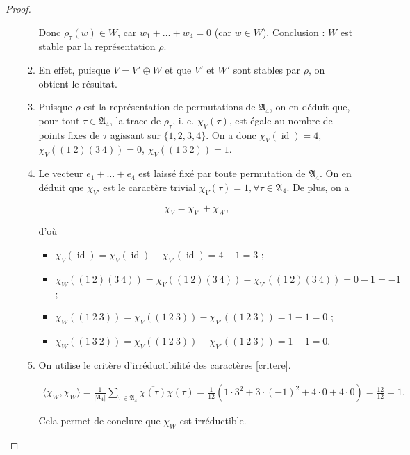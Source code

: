 \documentclass[french]{book}
\theoremstyle{definition}
\begin{document}
\begin{proof}
\begin{enumerate}
\begin{enumerate}
      Donc \(\rho _{\tau}(w) \in W\), car \(w_1 + \dots + w_4 = 0\) (car \(w \in W\)). Conclusion : \(W\) est stable par la représentation \(\rho\).
      \item En effet, puisque \(V = V' \oplus W\) et que \(V'\) et \(W'\) sont stables par \(\rho\), on obtient le résultat.
      \item Puisque \(\rho\) est la représentation de permutations de \(\mathfrak{A}_{4}\), on en déduit que, pour tout \(\tau \in \mathfrak{A}_{4}\), la trace de \(\rho _{\tau}\), i. e. \(\chi_V(\tau)\), est égale au nombre de points fixes de \(\tau\) agissant sur \(\{ 1, 2, 3, 4 \}\). On a donc \(\chi_V(\operatorname{id}) = 4\), \(\chi_V((1 \ 2)(3 \ 4)) = 0\), \(\chi_V((1 \ 3 \ 2)) = 1\).
      \item Le vecteur \(e_1 + \dots + e_4\) est laissé fixé par toute permutation de \(\mathfrak{A}_{4}\). On en déduit que \(\chi _{V'}\) est le caractère trivial \(\chi_V(\tau) = 1, \forall \tau \in \mathfrak{A}_{4}\). De plus, on a

      \[\chi_V = \chi _{V'} + \chi_W,\]

      d'où

      \begin{itemize}
        \item \(\chi_V(\operatorname{id}) = \chi_V(\operatorname{id}) - \chi _{V'}(\operatorname{id}) = 4-1 = 3\) ;
        \item \(\chi_W((1 \ 2) (3 \ 4)) = \chi_V((1 \ 2) (3 \ 4)) - \chi _{V'}((1 \ 2) (3 \ 4)) = 0 -1 = -1\) ;
        \item \(\chi_W ((1 \ 2 \ 3)) = \chi _{V}((1 \ 2 \ 3)) - \chi _{V'}((1 \ 2 \ 3)) = 1 - 1 = 0\) ;
        \item \(\chi_W ((1 \ 3 \ 2)) = \chi_V((1 \ 2 \ 3)) - \chi _{V'}((1 \ 2 \ 3)) = 1 - 1 = 0\).
      \end{itemize}

      \item On utilise le critère d'irréductibilité des caractères \ref{critere}.

      \begin{gather*}
        \langle \chi_W, \chi_W \rangle = \frac{1}{\left\lvert \mathfrak{A}_{4} \right\rvert} \sum_{\tau \in \mathfrak{A}_{4}} \overline{\chi(\tau)} \chi(\tau) = \frac{1}{12}(1 \cdot 3^2 + 3 \cdot (-1)^2 + 4 \cdot 0 + 4 \cdot 0) = \frac{12}{12}=1.
      \end{gather*}

      Cela permet de conclure que \(\chi_W\) est irréductible.
      \end{enumerate}
  \end{enumerate}
\end{proof}
\end{document}

